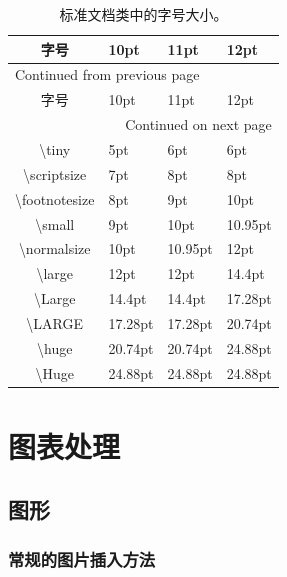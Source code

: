 \documentclass[12pt]{book}
\begin{document}
\begin{longtable}{|c|m{4.5cm}<{\centering}|m{3.5cm}<{\centering}|m{2.5cm}<{\centering}|}
     \caption{\label{absolute-font}标准文档类中的字号大小。}
     \\
     \hline
     字号 & 10pt & 11pt & 12pt\\
     \hline
     \endfirsthead
     \multicolumn{4}{l}{Continued from previous page} \\
     \hline
     
     字号 & 10pt & 11pt & 12pt \\
     
     \hline
     \endhead
     \hline\multicolumn{4}{r}{Continued on next page} \\
     \endfoot
     \endlastfoot
     \hline
     \textbackslash tiny & 5pt & 6pt & 6pt\\
     \hline
     \textbackslash scriptsize & 7pt & 8pt & 8pt\\
     \hline
     \textbackslash footnotesize & 8pt & 9pt & 10pt\\
     \hline
     \textbackslash small & 9pt & 10pt & 10.95pt\\
     \hline
     \textbackslash normalsize & 10pt & 10.95pt & 12pt\\
     \hline
     \textbackslash large & 12pt & 12pt & 14.4pt\\
     \hline
     \textbackslash Large & 14.4pt & 14.4pt & 17.28pt\\
     \hline
     \textbackslash LARGE & 17.28pt & 17.28pt & 20.74pt\\
     \hline
     \textbackslash huge & 20.74pt & 20.74pt & 24.88pt\\
     \hline
     \textbackslash Huge & 24.88pt & 24.88pt & 24.88pt\\
     \hline
\end{longtable}

\chapter{图表处理}

\section{图形}


\subsection{常规的图片插入方法}
\end{document}
